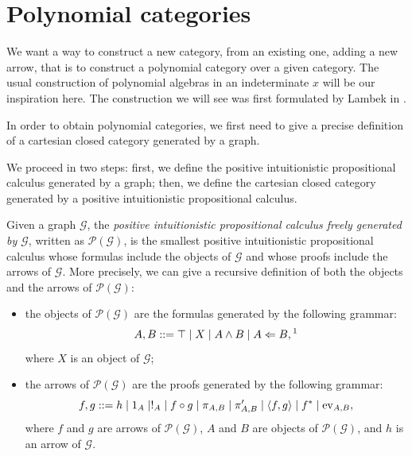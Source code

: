 \section{Polynomial categories}
We want a way to construct a new category, from an existing one, adding a new arrow, that is to construct a polynomial category over a given category.
The usual construction of polynomial algebras in an indeterminate $x$ will be our inspiration here. The construction we will see was first formulated by Lambek in \cite{Lambek1972,Lambek1974,Lambek1980a,Lambek1980}.

In order to obtain polynomial categories, we first need to give a precise definition of a cartesian closed category generated by a graph.

We proceed in two steps: first, we define the positive intuitionistic propositional calculus generated by a graph; then, we define the cartesian closed category generated by a positive intuitionistic propositional calculus.

\begin{definition}\label{idx:free-calculus}
    Given a graph $\mathcal G$, the \emph{positive intuitionistic propositional calculus freely generated by $\mathcal G$}, written as $\mathcal P(\mathcal G)$,
    is the smallest positive intuitionistic propositional calculus whose formulas include the objects of $\mathcal G$ and whose proofs include the arrows of $\mathcal G$.
    More precisely, we can give a recursive definition of both the objects and the arrows of $\mathcal P(\mathcal G)$:
    \begin{itemize}
        \item the objects of $\mathcal P(\mathcal G)$ are the formulas generated by the following grammar:
        \[ A,B ::= \top \mid X \mid A \land B \mid A \Leftarrow B,\textnormal{\footnotemark} \]
        where $X$ is an object of $\mathcal G$;
        \item the arrows of $\mathcal P(\mathcal G)$ are the proofs generated by the following grammar:
        \[ f,g ::= h \mid 1_A \mid !_A \mid f \circ g \mid \pi_{A,B} \mid \pi_{A,B}' \mid \langle f, g \rangle \mid f^* \mid \operatorname{ev}_{A,B},\]
        where $f$ and $g$ are arrows of $\mathcal P(\mathcal G)$, $A$ and $B$ are objects of $\mathcal P(\mathcal G)$, and $h$ is an arrow of $\mathcal G$.
    \end{itemize}
\end{definition}

